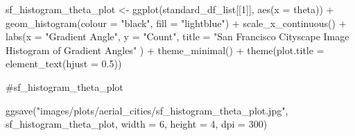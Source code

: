 \documentclass[
  letterpaper,
  DIV=11,
  numbers=noendperiod]{scrreprt}
\newenvironment{Shaded}{\begin{snugshade}}{\end{snugshade}}
\newcommand{\AttributeTok}[1]{\textcolor[rgb]{0.40,0.45,0.13}{#1}}
\newcommand{\CommentTok}[1]{\textcolor[rgb]{0.37,0.37,0.37}{#1}}
\newcommand{\DecValTok}[1]{\textcolor[rgb]{0.68,0.00,0.00}{#1}}
\newcommand{\FloatTok}[1]{\textcolor[rgb]{0.68,0.00,0.00}{#1}}
\newcommand{\FunctionTok}[1]{\textcolor[rgb]{0.28,0.35,0.67}{#1}}
\newcommand{\NormalTok}[1]{\textcolor[rgb]{0.00,0.23,0.31}{#1}}
\newcommand{\OtherTok}[1]{\textcolor[rgb]{0.00,0.23,0.31}{#1}}
\newcommand{\SpecialCharTok}[1]{\textcolor[rgb]{0.37,0.37,0.37}{#1}}
\newcommand{\StringTok}[1]{\textcolor[rgb]{0.13,0.47,0.30}{#1}}
\begin{document}
\begin{Shaded}
\begin{Highlighting}[]
\NormalTok{sf\_histogram\_theta\_plot }\OtherTok{\textless{}{-}}
  \FunctionTok{ggplot}\NormalTok{(standard\_df\_list[[}\DecValTok{1}\NormalTok{]], }
         \FunctionTok{aes}\NormalTok{(}\AttributeTok{x =}\NormalTok{ theta)) }\SpecialCharTok{+}
  \FunctionTok{geom\_histogram}\NormalTok{(}\AttributeTok{colour =} \StringTok{"black"}\NormalTok{, }\AttributeTok{fill =} \StringTok{"lightblue"}\NormalTok{) }\SpecialCharTok{+}
  \FunctionTok{scale\_x\_continuous}\NormalTok{() }\SpecialCharTok{+} 
  \FunctionTok{labs}\NormalTok{(}\AttributeTok{x =} \StringTok{"Gradient Angle"}\NormalTok{, }
       \AttributeTok{y =} \StringTok{"Count"}\NormalTok{, }
       \AttributeTok{title =} \StringTok{"San Francisco Cityscape Image Histogram of Gradient Angles"}
\NormalTok{       ) }\SpecialCharTok{+}
  \FunctionTok{theme\_minimal}\NormalTok{() }\SpecialCharTok{+}
  \FunctionTok{theme}\NormalTok{(}\AttributeTok{plot.title =} \FunctionTok{element\_text}\NormalTok{(}\AttributeTok{hjust =} \FloatTok{0.5}\NormalTok{))}

\CommentTok{\#sf\_histogram\_theta\_plot}

\FunctionTok{ggsave}\NormalTok{(}\StringTok{"images/plots/aerial\_cities/sf\_histogram\_theta\_plot.jpg"}\NormalTok{, sf\_histogram\_theta\_plot, }\AttributeTok{width =} \DecValTok{6}\NormalTok{, }\AttributeTok{height =} \DecValTok{4}\NormalTok{, }\AttributeTok{dpi =} \DecValTok{300}\NormalTok{)}
\end{Highlighting}
\end{Shaded}
\end{document}
